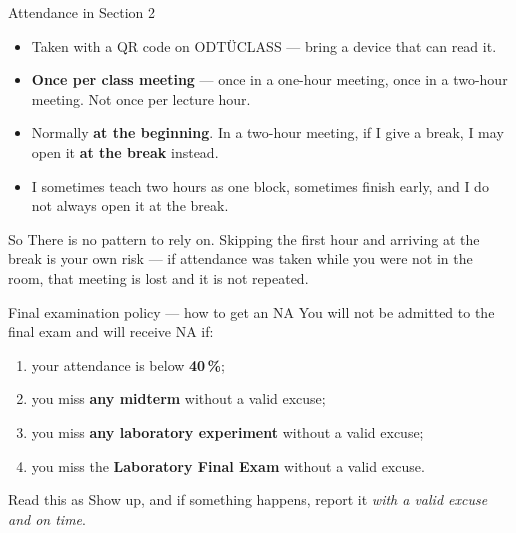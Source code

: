 \documentclass[11pt,aspectratio=169]{beamer}
\newcommand{\mysection}{Section 2}
\begin{document}
\begin{frame}{Attendance in \mysection}
  \begin{itemize}
    \item Taken with a \alert{QR code on ODTÜCLASS} --- bring a device that can read it.
    \item \textbf{Once per class meeting} --- once in a one-hour meeting, once in a two-hour
          meeting. Not once per lecture hour.
    \item Normally \textbf{at the beginning}. In a two-hour meeting, if I give a break,
          I may open it \textbf{at the break} instead.
    \item I sometimes teach two hours as one block, sometimes finish early, and I do not
          always open it at the break.
  \end{itemize}
  \vfill
  \begin{block}{So}
    There is no pattern to rely on. Skipping the first hour and arriving at the break is
    \alert{your own risk} --- if attendance was taken while you were not in the room,
    that meeting is lost and it is not repeated.
  \end{block}
\end{frame}

\begin{frame}{Final examination policy --- how to get an NA}
  You will \alert{not be admitted to the final exam} and will receive \alert{NA} if:
  \vspace{0.6em}
  \begin{enumerate}
    \item your attendance is below \textbf{40\,\%};
    \item you miss \textbf{any midterm} without a valid excuse;
    \item you miss \textbf{any laboratory experiment} without a valid excuse;
    \item you miss the \textbf{Laboratory Final Exam} without a valid excuse.
  \end{enumerate}
  \vfill
  \begin{block}{Read this as}
    Show up, and if something happens, report it \emph{with a valid excuse and on time}.
  \end{block}
\end{frame}
\end{document}
